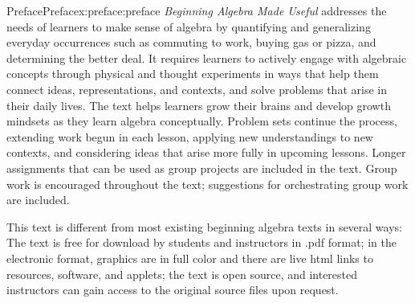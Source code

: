 \documentclass[oneside,10pt,]{book}
\newcommand{\pubtitle}[1]{\textsl{#1}}
\numberwithin{equation}{chapter}
\begin{document}
\null\clearpage
%
%
\typeout{************************************************}
\typeout{************************************************}
%
\begin{preface}{Preface}{}{Preface}{}{}{x:preface:preface}
\pubtitle{Beginning Algebra Made Useful} addresses the needs of learners to make sense of algebra by quantifying and generalizing everyday occurrences such as commuting to work, buying gas or pizza, and determining the better deal.  It requires learners to actively engage with algebraic concepts through physical and thought experiments in ways that help them connect ideas, representations, and contexts, and solve problems that arise in their daily lives.  The text helps learners grow their brains and develop growth mindsets as they learn algebra conceptually.  Problem sets continue the process, extending work begun in each lesson, applying new understandings to new contexts, and considering ideas that arise more fully in upcoming lessons.  Longer assignments that can be used as group projects are included in the text. Group work is encouraged throughout the text; suggestions for orchestrating group work are included.%
\par
This text is different from most existing beginning algebra texts in several ways: The text is free for download by students and instructors in .pdf format; in the electronic format, graphics are in full color and there are live html links to resources, software, and applets; the text is open source, and interested instructors can gain access to the original source files upon request.%
\end{preface}
\setcounter{tocdepth}{1}
\renewcommand*\contentsname{Contents}
\tableofcontents
\mainmatter
%
%
\typeout{************************************************}
\typeout{************************************************}
%
\end{document}
